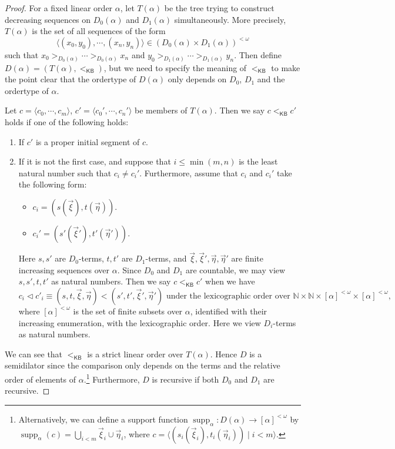 \documentclass{mhkr}
\newcommand{\lag}{\langle}
\newcommand{\rag}{\rangle}
\newcommand{\bbN}{\mathbb{N}}
\newcommand{\supp}{\operatorname{supp}}
\newcommand{\KB}{\mathsf{KB}}
\begin{document}
\begin{proof}
    For a fixed linear order $\alpha$, let $T(\alpha)$ be the tree trying to construct decreasing sequences on $D_0(\alpha)$ and $D_1(\alpha)$ simultaneously. More precisely, $T(\alpha)$ is the set of all sequences of the form
    \begin{equation*}
        \lag (x_0,y_0),\cdots, (x_n,y_n)\rag \in (D_0(\alpha)\times D_1(\alpha))^{<\omega}
    \end{equation*}
    such that $x_0>_{D_0(\alpha)}\cdots >_{D_0(\alpha)} x_n$ and $y_0>_{D_1(\alpha)}\cdots >_{D_1(\alpha)} y_n$.
    Then define $D(\alpha) = (T(\alpha),<_{\KB})$, but we need to specify the meaning of $<_{\KB}$ to make the point clear that the ordertype of $D(\alpha)$ only depends on $D_0$, $D_1$ and the ordertype of $\alpha$.
    
    Let $c=\lag c_0,\cdots, c_m\rag$, $c'=\lag c_0',\cdots,c_n'\rag$ be members of $T(\alpha)$. Then we say $c <_{\KB} c'$ holds if one of the following holds:
    \begin{enumerate}
        \item If $c'$ is a proper initial segment of $c$.
        \item If it is not the first case, and suppose that $i\le\min(m,n)$ is the least natural number such that $c_i\neq c_i'$. Furthermore, assume that $c_i$ and $c_i'$ take the following form:
        \begin{itemize}
            \item $c_i = (s(\vec{\xi}),t(\vec{\eta}))$.
            \item $c_i' = (s'(\vec{\xi}'),t'(\vec{\eta}'))$.
        \end{itemize}
        Here $s,s'$ are $D_0$-terms, $t,t'$ are $D_1$-terms, and $\vec{\xi}, \vec{\xi}', \vec{\eta}, \vec{\eta}'$ are finite increasing sequences over $\alpha$. Since $D_0$ and $D_1$ are countable, we may view $s,s',t,t'$ as natural numbers.
        Then we say $c<_{\KB} c'$ when we have
        \begin{equation*}
            c_i \vartriangleleft c'_i \equiv 
            (s,t,\vec{\xi},\vec{\eta}) < (s',t',\vec{\xi}',\vec{\eta}')\text{ under the lexicographic order over $\bbN\times\bbN\times [\alpha]^{<\omega}\times [\alpha]^{<\omega}$,}
        \end{equation*}
        where $[\alpha]^{<\omega}$ is the set of finite subsets over $\alpha$, identified with their increasing enumeration, with the lexicographic order. Here we view $D_i$-terms as natural numbers.
    \end{enumerate}
    We can see that $<_\KB$ is a strict linear order over $T(\alpha)$.
    Hence $D$ is a semidilator since the comparison only depends on the terms and the relative order of elements of $\alpha$.\footnote{Alternatively, we can define a support function $\supp_\alpha\colon D(\alpha)\to [\alpha]^{<\omega}$ by $\supp_\alpha(c)=\bigcup_{i<m} \vec{\xi}_i\cup \vec{\eta}_i$, where $c=\lag(s_i(\vec{\xi}_i), t_i(\vec{\eta}_i)) \mid i<m\rag$.}
    Furthermore, $D$ is recursive if both $D_0$ and $D_1$ are recursive.


\end{proof}
\end{document}
